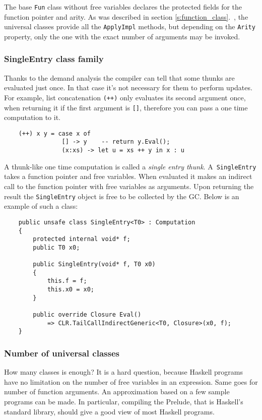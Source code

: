 \documentclass[en]{pracamgr}
\newcommand{\myref}[1]{\ref{#1}.~\textit{\nameref{#1}}}
\begin{document}
The base \texttt{Fun} class without free variables declares
the protected fields for the function pointer and arity.
As was described in section \myref{s:function_class},
the universal classes provide all the \texttt{ApplyImpl} methods,
but depending on the \texttt{Arity} property,
only the one with the exact number of arguments may be invoked.

\subsubsection{SingleEntry class family}

Thanks to the demand analysis \cite{demand analysis} the compiler can
tell that some thunks are evaluated just once.
In that case it's not necessary for them to perform updates.
For example, list concatenation \texttt{(++)} only evaluates its
second argument once, when returning it if the first argument is \texttt{[]},
therefore you can pass a one time computation to it.

\begin{verbatim}
    (++) x y = case x of
                [] -> y    -- return y.Eval();
                (x:xs) -> let u = xs ++ y in x : u
\end{verbatim}

A thunk-like one time computation is called a \textit{single entry thunk}.
A~\texttt{SingleEntry} takes a function pointer and free
variables. When evaluated it makes an indirect call to the
function pointer with free variables as arguments.
Upon returning the result the \texttt{SingleEntry} object
is free to be collected by the GC.
Below is an example of such a class:

\begin{verbatim}
    public unsafe class SingleEntry<T0> : Computation
    {
        protected internal void* f;
        public T0 x0;

        public SingleEntry(void* f, T0 x0)
        {
            this.f = f;
            this.x0 = x0;
        }

        public override Closure Eval()
            => CLR.TailCallIndirectGeneric<T0, Closure>(x0, f);
    }
\end{verbatim}

\subsubsection{Number of universal classes}

How many classes is enough? It is a hard question, because Haskell
programs have no limitation on the number of free variables in an
expression. Same goes for number of function arguments.
An approximation based on a few sample programs can be made.
In particular, compiling the Prelude, that is Haskell's standard
library, should give a good view of most Haskell programs.
\end{document}
